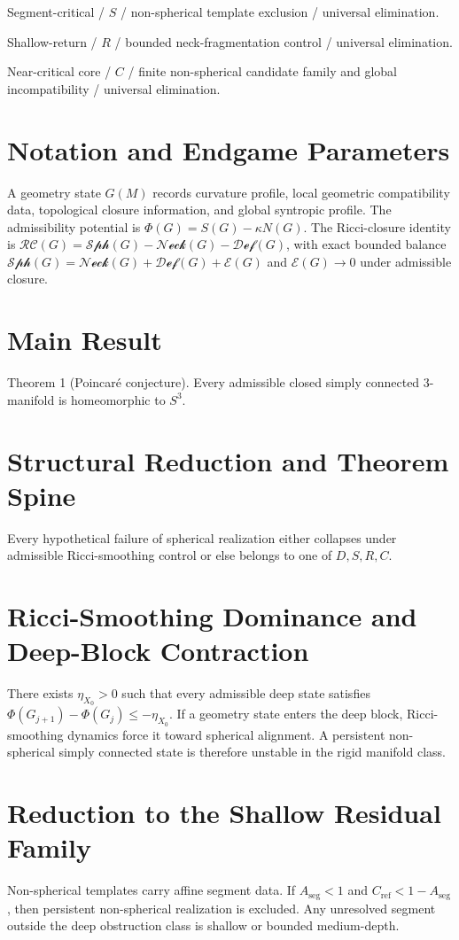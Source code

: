 \documentclass[11pt]{article}
\theoremstyle{definition}
\begin{document}
Segment-critical / $S$ / non-spherical template exclusion / universal elimination.

Shallow-return / $R$ / bounded neck-fragmentation control / universal elimination.

Near-critical core / $C$ / finite non-spherical candidate family and global incompatibility / universal elimination.
\section{Notation and Endgame Parameters}
A geometry state $G(M)$ records curvature profile, local geometric compatibility data, topological closure information, and global syntropic profile. The admissibility potential is $\Phi(G)=S(G)-\kappa N(G)$. The Ricci-closure identity is $\mathcal{RC}(G)=\mathcal{Sph}(G)-\mathcal{Neck}(G)-\mathcal{Def}(G)$, with exact bounded balance $\mathcal{Sph}(G)=\mathcal{Neck}(G)+\mathcal{Def}(G)+\mathcal E(G)$ and $\mathcal E(G)\to 0$ under admissible closure.
\section{Main Result}
Theorem 1 (Poincar\'e conjecture). Every admissible closed simply connected $3$-manifold is homeomorphic to $S^3$.
\section{Structural Reduction and Theorem Spine}
Every hypothetical failure of spherical realization either collapses under admissible Ricci-smoothing control or else belongs to one of $D,S,R,C$.
\section{Ricci-Smoothing Dominance and Deep-Block Contraction}
There exists $\eta_{X_0}>0$ such that every admissible deep state satisfies $\Phi(G_{j+1})-\Phi(G_j)\le -\eta_{X_0}$. If a geometry state enters the deep block, Ricci-smoothing dynamics force it toward spherical alignment. A persistent non-spherical simply connected state is therefore unstable in the rigid manifold class.
\section{Reduction to the Shallow Residual Family}
Non-spherical templates carry affine segment data. If $A_{\mathrm{seg}}<1$ and $C_{\mathrm{ref}}<1-A_{\mathrm{seg}}$, then persistent non-spherical realization is excluded. Any unresolved segment outside the deep obstruction class is shallow or bounded medium-depth.
\end{document}
